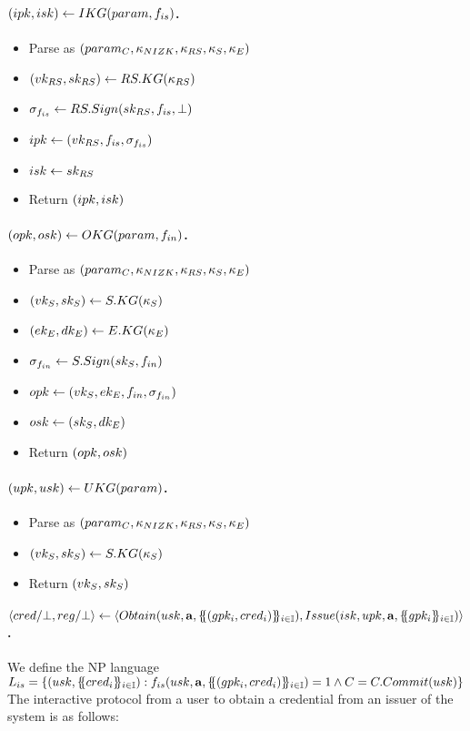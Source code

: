 \paragraph{$(ipk,isk) \gets IKG(param,f_{is})$.} %
\begin{itemize}
\item Parse \parm as $(param_C,\kappa_{NIZK},\kappa_{RS},\kappa_{S},\kappa_{E})$
\item $(vk_{RS},sk_{RS}) \gets RS.KG(\kappa_{RS})$  
\item $\sigma_{f_{is}} \gets RS.Sign(sk_{RS},f_{is},\bot)$
\item $ipk \gets (vk_{RS},f_{is},\sigma_{f_{is}})$
\item $isk \gets sk_{RS}$
\item Return $(ipk,isk)$
\end{itemize}

\paragraph{$(opk,osk) \gets OKG(param,f_{in})$.} %
\begin{itemize}
\item Parse \parm as $(param_C,\kappa_{NIZK},\kappa_{RS},\kappa_{S},\kappa_{E})$
\item $(vk_{S},sk_{S}) \gets S.KG(\kappa_{S})$
\item $(ek_{E},dk_{E}) \gets E.KG(\kappa_{E})$
\item $\sigma_{f_{in}} \gets S.Sign(sk_{S},f_{in})$
\item $opk \gets (vk_{S},ek_{E},f_{in},\sigma_{f_{in}})$
\item $osk \gets (sk_{S},dk_{E})$
\item Return $(opk,osk)$
\end{itemize}

\paragraph{$(upk,usk) \gets UKG(param)$.} %
\begin{itemize}
\item Parse \parm as $(param_C,\kappa_{NIZK},\kappa_{RS},\kappa_{S},\kappa_{E})$
\item $(vk_{S},sk_{S}) \gets S.KG(\kappa_{S})$
\item Return $(vk_{S},sk_{S})$
\end{itemize}

\paragraph{$\langle cred/\bot,reg/\bot \rangle \gets
  \langle
  Obtain(usk,\mathbf{a},\{\mskip-5mu\{ (gpk_i,cred_i)\}\mskip-5mu\}_{i \in \mathbb{I}}),
  Issue(isk,upk,\mathbf{a},\{\mskip-5mu\{ gpk_i \}\mskip-5mu\}_{i \in \mathbb{I}})
  \rangle$.} %
We define the NP language $L_{is} = \lbrace (usk,
\{\mskip-5mu\{ cred_i \}\mskip-5mu\}_{i \in \mathbb{I}}): f_{is}(usk,\mathbf{a},\{\mskip-5mu\{
(gpk_i,cred_i) \}\mskip-5mu\}_{i \in \mathbb{I}}) = 1 \land C = C.Commit(usk)
\rbrace$  The interactive protocol from a user to obtain a credential
from an issuer of the system is as follows:

